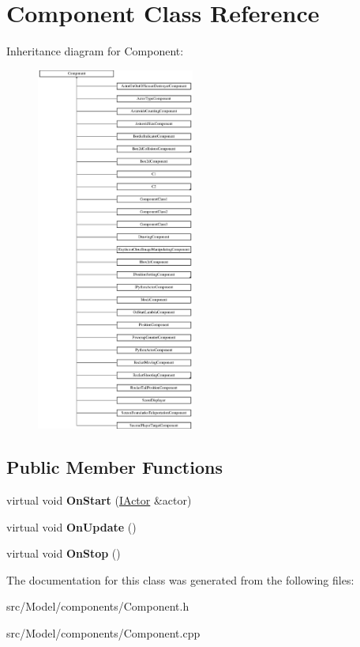 \hypertarget{classComponent}{}\section{Component Class Reference}
\label{classComponent}
Inheritance diagram for Component\+:\begin{figure}[H]
\begin{center}
\leavevmode
\includegraphics[height=12.000000cm]{classComponent}
\end{center}
\end{figure}
\subsection*{Public Member Functions}
\begin{DoxyCompactItemize}
\item 
virtual void {\bfseries On\+Start} (\hyperlink{classIActor}{I\+Actor} \&actor)\hypertarget{classComponent_ac75891ad8b5dac47d4cec7c0f56c74c9}{}\label{classComponent_ac75891ad8b5dac47d4cec7c0f56c74c9}

\item 
virtual void {\bfseries On\+Update} ()\hypertarget{classComponent_a9680b491a1f64d8d7c140bb526176c74}{}\label{classComponent_a9680b491a1f64d8d7c140bb526176c74}

\item 
virtual void {\bfseries On\+Stop} ()\hypertarget{classComponent_a19dd4b600d60aeddaa41a1fea7e446f4}{}\label{classComponent_a19dd4b600d60aeddaa41a1fea7e446f4}

\end{DoxyCompactItemize}


The documentation for this class was generated from the following files\+:\begin{DoxyCompactItemize}
\item 
src/\+Model/components/Component.\+h\item 
src/\+Model/components/Component.\+cpp\end{DoxyCompactItemize}
